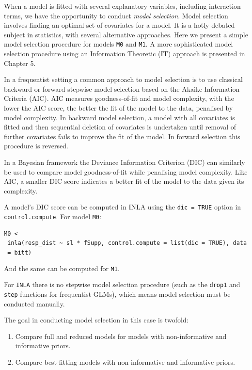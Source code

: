 \documentclass[
]{book}
\begin{document}
When a model is fitted with several explanatory variables, including interaction terms, we have the opportunity to conduct \emph{model selection}. Model selection involves finding an optimal set of covariates for a model. It is a hotly debated subject in statistics, with several alternative approaches. Here we present a simple model selection procedure for models \texttt{M0} and \texttt{M1}. A more sophisticated model selection procedure using an Information Theoretic (IT) approach is presented in Chapter 5.

In a frequentist setting a common approach to model selection is to use classical backward or forward stepwise model selection based on the Akaike Information Criteria (AIC). AIC measures goodness-of-fit and model complexity, with the lower the AIC score, the better the fit of the model to the data, penalised by model complexity. In backward model selection, a model with all covariates is fitted and then sequential deletion of covariates is undertaken until removal of further covariates fails to improve the fit of the model. In forward selection this procedure is reversed.

In a Bayesian framework the Deviance Information Criterion (DIC) can similarly be used to compare model goodness-of-fit while penalising model complexity. Like AIC, a smaller DIC score indicates a better fit of the model to the data given its complexity.

A model's DIC score can be computed in INLA using the \texttt{dic\ =\ TRUE} option in \texttt{control.compute}. For model \texttt{M0}:

\texttt{M0\ \textless{}-\ inla(resp\_dist\ \textasciitilde{}\ sl\ *\ fSupp,\ control.compute\ =\ list(dic\ =\ TRUE),\ data\ =\ bitt)}

And the same can be computed for \texttt{M1}.

For \texttt{INLA} there is no stepwise model selection procedure (such as the \texttt{drop1} and \texttt{step} functions for frequentist GLMs), which means model selection must be conducted manually.

The goal in conducting model selection in this case is twofold:

\begin{enumerate}
\def\labelenumi{\arabic{enumi}.}
\item
  Compare full and reduced models for models with non-informative and informative priors.
\item
  Compare best-fitting models with non-informative and informative priors.
\end{enumerate}
\end{document}

